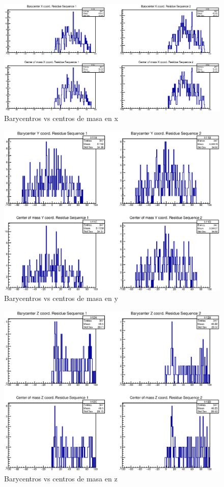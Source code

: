 \begin{figure}[htbp]
    \centering
    \includegraphics[width=1\linewidth]{./Figures/can1.eps}
    \caption[Barycentros vs centros de masa en x]{Barycentros vs centros de masa en x} %
    \label{fig:canx}
\end{figure}

\begin{figure}[htbp]
    \centering
    \includegraphics[width=1\linewidth]{./Figures/can2.eps}
    \caption[Barycentros vs centros de masa en y]{Barycentros vs centros de masa en y}
    \label{fig:cany}
\end{figure}

\begin{figure}[htbp]
    \centering
    \includegraphics[width=1\linewidth]{./Figures/can3.eps}
  \caption[Barycentros vs centros de masa en z]{Barycentros vs centros de masa en z}
    \label{fig:canz}
\end{figure}
